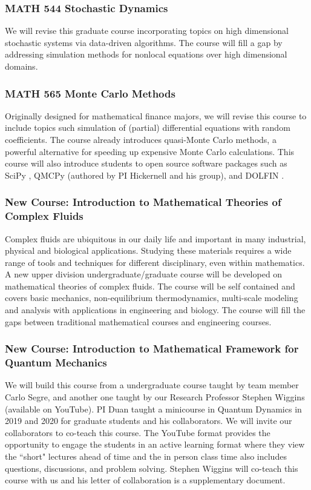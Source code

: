 \documentclass[11pt]{NSFamsart}
\begin{document}
\subsubsection*{MATH 544 Stochastic Dynamics}
We will revise this graduate course  incorporating topics on  high dimensional stochastic systems via data-driven algorithms.  The course will fill a gap by addressing simulation methods for nonlocal equations over high dimensional domains.

\subsubsection*{MATH 565 Monte Carlo Methods} Originally designed for mathematical finance majors, we will revise this course to include topics such simulation of (partial) differential equations with random coefficients.  The course already introduces quasi-Monte Carlo methods, a powerful alternative for speeding up expensive Monte Carlo calculations.  This course will also introduce students to open source software packages such as SciPy \cite{virtanen2020scipy}, QMCPy \cite{QMCPy2020a} (authored by PI Hickernell and his group), and DOLFIN \cite{Dolphin12}. 

\subsubsection*{New Course: Introduction to Mathematical Theories of Complex Fluids} 
Complex fluids are ubiquitous in our daily life and important in many industrial, physical and biological applications. Studying these materials requires a wide range 
of tools and techniques for different disciplinary, even within mathematics. A new upper division undergraduate/graduate course will be developed on mathematical theories of complex fluids. The course will be self contained and covers basic mechanics, non-equilibrium thermodynamics, multi-scale modeling and analysis with applications in engineering and biology. The course will fill the gaps between traditional mathematical courses and engineering courses.
 
\subsubsection*{New Course: Introduction to Mathematical Framework for Quantum Mechanics} We will build this course from  a   undergraduate course   taught by team member Carlo Segre, and another one taught by our Research Professor Stephen Wiggins (available on YouTube). PI Duan   taught a minicourse in Quantum Dynamics \cite{Gutzwiller1990ChaosIC, Holland1993TheQT,Lindgren2019QuantumMC,Micha2006QuantumDW} in 2019 and 2020 for graduate students and his collaborators.  We will invite our collaborators to co-teach this course. 
The YouTube format provides the opportunity to engage the students in an active learning format where they view the “short" lectures ahead of time and the in person class time  also includes  questions, discussions, and problem solving. Stephen Wiggins will co-teach this course with us and his letter of collaboration is a supplementary document.
\end{document}
